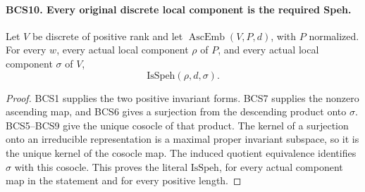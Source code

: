 \paragraph{BCS10. Every original discrete local component is the required Speh.}
\label{claim:BCS10}
Let \(V\) be discrete of positive rank and let
\(\operatorname{AscEmb}(V,P,d)\), with \(P\) normalized.
For every \(w\), every actual local component \(\rho\) of
\(P\), and every actual local component \(\sigma\) of \(V\),
\[
                         \mathrm{IsSpeh}(\rho,d,\sigma).
 \tag{BCS.19}
\]
\begin{proof}
BCS1 supplies the two positive invariant forms.  BCS7 supplies the
nonzero ascending map, and BCS6 gives a surjection from the
descending product onto \(\sigma\).  BCS5--BCS9 give the unique
cosocle of that product.  The kernel of a surjection onto an
irreducible representation is a maximal proper invariant subspace,
so it is the unique kernel of the cosocle map.  The induced quotient
equivalence identifies \(\sigma\) with this cosocle.  This proves
the literal \(\mathrm{IsSpeh}\), for every actual component map
in the statement and for every positive length.
\end{proof}

